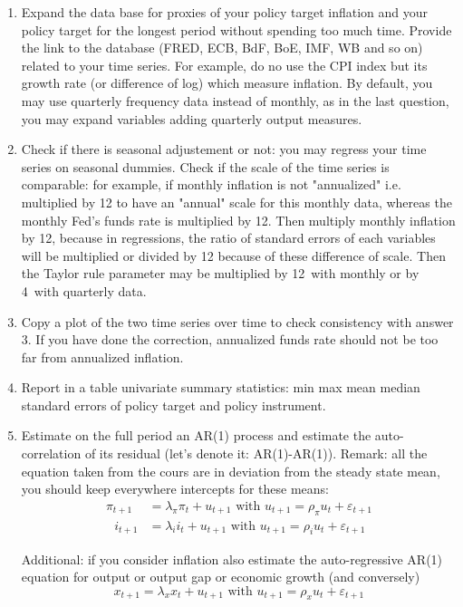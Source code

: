 \documentclass[12pt,a4paper]{article}%
\begin{document}
\begin{enumerate}
\textbf{PART 4: Your example}

\item Expand the data base for proxies of your policy target inflation and
your policy target for the longest period without spending too much time.
Provide the link to the database (FRED, ECB, BdF, BoE, IMF, WB and so on)
related to your time series. For example, do no use the CPI index but its
growth rate (or difference of log) which measure inflation. By default, you
may use quarterly frequency data instead of monthly, as in the last question,
you may expand variables adding quarterly output measures.

\item Check if there is seasonal adjustement or not: you may regress your time
series on seasonal dummies. Check if the scale of the time series is
comparable: for example, if monthly inflation is not "annualized" i.e.
multiplied by 12 to have an "annual" scale for this monthly data, whereas the
monthly Fed's funds rate is multiplied by 12. Then multiply monthly inflation
by 12, because in regressions, the ratio of standard errors of each variables
will be multiplied or divided by 12 because of these difference of scale. Then
the Taylor rule parameter may be multiplied by 12\ with monthly or by 4\ with
quarterly data.

\item Copy a plot of the two time series over time to check consistency with
answer 3. If you have done the correction, annualized funds rate should not be
too far from annualized inflation.

\item Report in a table univariate summary statistics: min max mean median
standard errors of policy target and policy instrument.

\item Estimate on the full period an AR(1) process and estimate the
auto-correlation of its residual (let's denote it: AR(1)-AR(1)). Remark: all
the equation taken from the cours are in deviation from the steady state mean,
you should keep everywhere intercepts for these means:%
\begin{align*}
\pi_{t+1} &  =\lambda_{\pi}\pi_{t}+u_{t+1}\text{ with }u_{t+1}=\rho_{\pi}%
u_{t}+\varepsilon_{t+1}\\
\text{ }i_{t+1} &  =\lambda_{i}i_{t}+u_{t+1}\text{ with }u_{t+1}=\rho_{i}%
u_{t}+\varepsilon_{t+1}%
\end{align*}


Additional: if you consider inflation also estimate the auto-regressive AR(1)
equation for output or output gap or economic growth (and conversely)%
\[
x_{t+1}=\lambda_{x}x_{t}+u_{t+1}\text{ with }u_{t+1}=\rho_{x}u_{t}%
+\varepsilon_{t+1}%
\]



\end{enumerate}
\end{document}
